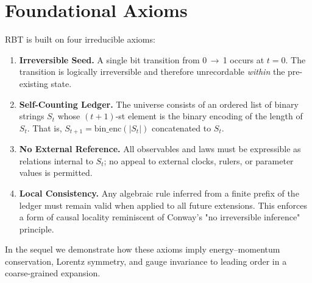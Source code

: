 \section{Foundational Axioms}
\label{sec:axioms}
RBT is built on four irreducible axioms:

\begin{enumerate}
  \item \textbf{Irreversible Seed.}  A single bit transition from 0\,$\to$\,1 occurs at $t=0$.  The transition is logically irreversible and therefore unrecordable \emph{within} the pre-existing state.
  \item \textbf{Self-Counting Ledger.}  The universe consists of an ordered list of binary strings $S_t$ whose $(t+1)$-st element is the binary encoding of the length of $S_t$.  That is, $S_{t+1} = \text{bin\_enc}(|S_t|)$ concatenated to $S_t$.
  \item \textbf{No External Reference.}  All observables and laws must be expressible as relations internal to $S_t$; no appeal to external clocks, rulers, or parameter values is permitted.
  \item \textbf{Local Consistency.}  Any algebraic rule inferred from a finite prefix of the ledger must remain valid when applied to all future extensions.  This enforces a form of causal locality reminiscent of Conway's "no irreversible inference" principle.
\end{enumerate}

In the sequel we demonstrate how these axioms imply energy--momentum conservation, Lorentz symmetry, and gauge invariance to leading order in a coarse-grained expansion.
\clearpage 